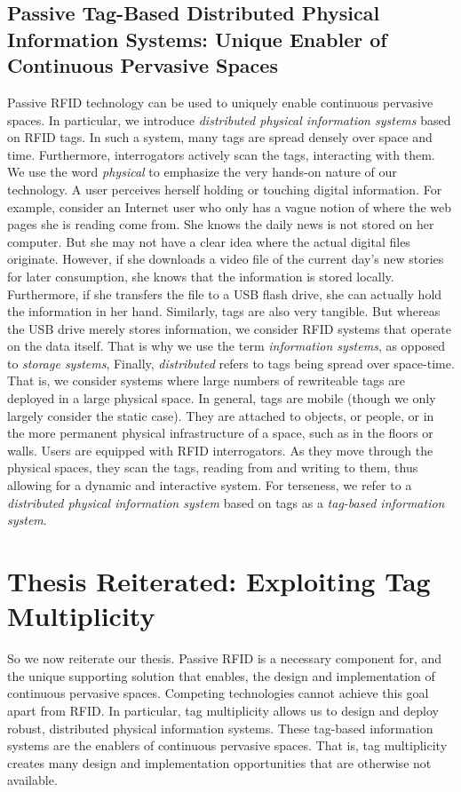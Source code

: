 \subsection{Passive Tag-Based Distributed Physical Information Systems: Unique Enabler of Continuous Pervasive Spaces}
Passive RFID technology can be used to uniquely enable continuous pervasive spaces. In particular, we introduce \emph{distributed physical information systems} based on RFID tags. In such a system, many tags are spread densely over space and time. Furthermore, interrogators actively scan the tags, interacting with them. We use the word \emph{physical} to emphasize the very hands-on nature of our technology. A user perceives herself holding or touching digital information. For example, consider an Internet user who only has a vague notion of where the web pages she is reading come from. She knows the daily news is not stored on her computer. But she may not have a clear idea where the actual digital files originate. However, if she downloads a video file of the current day's new stories for later consumption, she knows that the information is stored locally. Furthermore, if she transfers the file to a USB flash drive, she can actually hold the information in her hand. Similarly, tags are also very tangible. But whereas the USB drive merely stores information, we consider RFID systems that operate on the data itself. That is why we use the term \emph{information systems}, as opposed to \emph{storage systems}, Finally, \emph{distributed} refers to tags being spread over space-time. That is, we consider systems where large numbers of rewriteable tags are deployed in a large physical space. In general, tags are mobile (though we only largely consider the static case). They are attached to objects, or people, or in the more permanent physical infrastructure of a space, such as in the floors or walls. Users are equipped with RFID interrogators. As they move through the physical spaces, they scan the tags, reading from and writing to them, thus allowing for a dynamic and interactive system. For terseness, we refer to a \emph{distributed physical information system} based on tags as a \emph{tag-based information system}.

\section{Thesis Reiterated: Exploiting Tag Multiplicity}
So we now reiterate our thesis. Passive RFID is a necessary component for, and the unique supporting solution that enables, the design and implementation of continuous pervasive spaces. Competing technologies cannot achieve this goal apart from RFID. In particular, tag multiplicity allows us to design and deploy robust, distributed physical information systems. These tag-based information systems are the enablers of continuous pervasive spaces. That is, tag multiplicity creates many design and implementation opportunities that are otherwise not available. 

